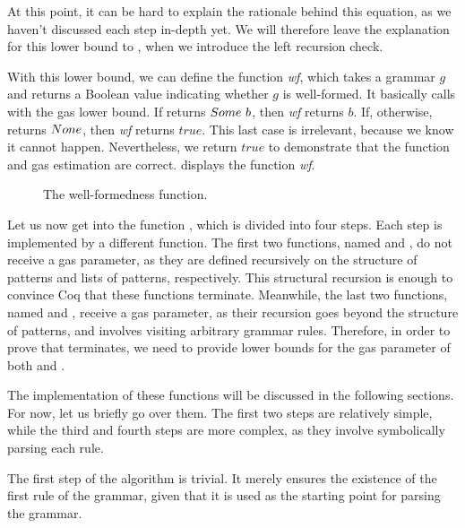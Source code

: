 At this point,
it can be hard to explain the rationale behind this equation,
as we haven't discussed each step in-depth yet.
We will therefore leave the explanation for this lower bound
to ,
when we introduce the left recursion check.

With this lower bound,
we can define the function \textit{wf},
which takes a grammar $g$ and returns a Boolean value
indicating whether $g$ is well-formed.
It basically calls \textit{\verifygrammarname{}}
with the gas lower bound.
If \textit{\verifygrammarname{}} returns $Some\ b$,
then \textit{wf} returns $b$.
If, otherwise, \textit{\verifygrammarname{}} returns $None$,
then \textit{wf} returns $true$.
This last case is irrelevant, because we know it cannot happen.
Nevertheless, we return $true$
to demonstrate that the function
and gas estimation are correct.
 displays the function \textit{wf}.
\begin{figure}
    \centering
    
    \caption{The well-formedness function.}
    \label{fig:wf}
\end{figure}

Let us now get into the function \textit{\verifygrammarname{}},
which is divided into four steps.
Each step is implemented by a different function.
The first two functions,
named \textit{\coherentname{}} and \textit{\lcoherentname{}},
do not receive a gas parameter,
as they are defined recursively on the structure of patterns
and lists of patterns, respectively.
This structural recursion is enough to convince Coq
that these functions terminate.
Meanwhile, the last two functions,
named \textit{\lverifyrulename{}} and \textit{\lcheckloopsname{}},
receive a gas parameter,
as their recursion goes beyond the structure of patterns,
and involves visiting arbitrary grammar rules.
Therefore, in order to prove that \textit{\verifygrammarname{}} terminates,
we need to provide lower bounds for the gas parameter of both
\textit{\lverifyrulename{}} and \textit{\lcheckloopsname{}}.

The implementation of these functions
will be discussed in the following sections.
For now, let us briefly go over them.
The first two steps are relatively simple,
while the third and fourth steps are more complex,
as they involve symbolically parsing each rule.

The first step of the algorithm is trivial.
It merely ensures the existence of
the first rule of the grammar,
given that it is used as the starting point
for parsing the grammar.

